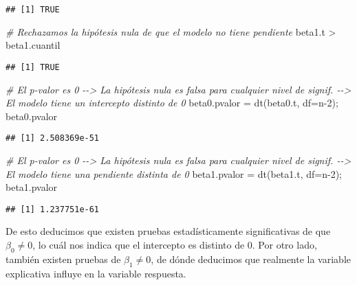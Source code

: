 \documentclass[
]{article}
\newenvironment{Shaded}{\begin{snugshade}}{\end{snugshade}}
\newcommand{\AttributeTok}[1]{\textcolor[rgb]{0.77,0.63,0.00}{#1}}
\newcommand{\CommentTok}[1]{\textcolor[rgb]{0.56,0.35,0.01}{\textit{#1}}}
\newcommand{\DecValTok}[1]{\textcolor[rgb]{0.00,0.00,0.81}{#1}}
\newcommand{\FunctionTok}[1]{\textcolor[rgb]{0.00,0.00,0.00}{#1}}
\newcommand{\NormalTok}[1]{#1}
\newcommand{\OtherTok}[1]{\textcolor[rgb]{0.56,0.35,0.01}{#1}}
\newcommand{\SpecialCharTok}[1]{\textcolor[rgb]{0.00,0.00,0.00}{#1}}
\begin{document}
\begin{verbatim}
## [1] TRUE
\end{verbatim}

\begin{Shaded}
\begin{Highlighting}[]
\CommentTok{\# Rechazamos la hipótesis nula de que el modelo no tiene pendiente}
\NormalTok{beta1.t }\SpecialCharTok{\textgreater{}}\NormalTok{ beta1.cuantil}
\end{Highlighting}
\end{Shaded}

\begin{verbatim}
## [1] TRUE
\end{verbatim}

\begin{Shaded}
\begin{Highlighting}[]
\CommentTok{\# El p{-}valor es 0 {-}{-}\textgreater{} La hipótesis nula es falsa para cualquier nivel de signif. {-}{-}\textgreater{} El modelo tiene un intercepto distinto de 0}
\NormalTok{beta0.pvalor }\OtherTok{=} \FunctionTok{dt}\NormalTok{(beta0.t, }\AttributeTok{df=}\NormalTok{n}\DecValTok{{-}2}\NormalTok{); beta0.pvalor}
\end{Highlighting}
\end{Shaded}

\begin{verbatim}
## [1] 2.508369e-51
\end{verbatim}

\begin{Shaded}
\begin{Highlighting}[]
\CommentTok{\# El p{-}valor es 0 {-}{-}\textgreater{} La hipótesis nula es falsa para cualquier nivel de signif. {-}{-}\textgreater{} El modelo tiene una pendiente distinta de 0}
\NormalTok{beta1.pvalor }\OtherTok{=} \FunctionTok{dt}\NormalTok{(beta1.t, }\AttributeTok{df=}\NormalTok{n}\DecValTok{{-}2}\NormalTok{); beta1.pvalor}
\end{Highlighting}
\end{Shaded}

\begin{verbatim}
## [1] 1.237751e-61
\end{verbatim}

De esto deducimos que existen pruebas estadísticamente significativas de
que \(\beta_0 \neq 0\), lo cuál nos indica que el intercepto es distinto
de 0. Por otro lado, también existen pruebas de \(\beta_1 \neq 0\), de
dónde deducimos que realmente la variable explicativa influye en la
variable respuesta.
\end{document}

